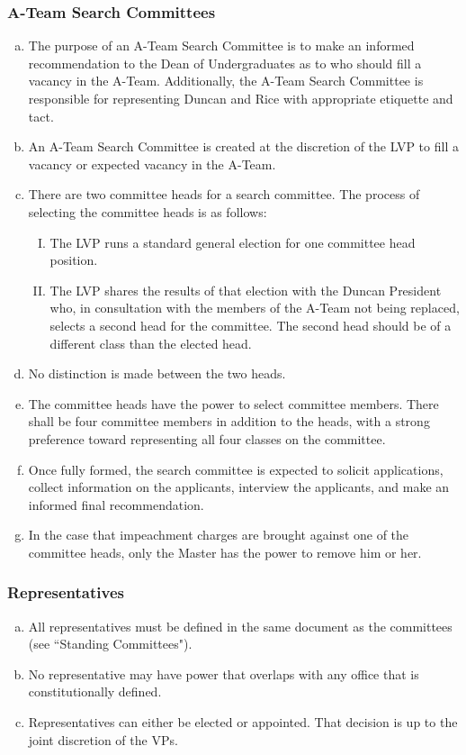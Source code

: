 \documentclass[USletter,12pt]{article}
\begin{document}
\begin{enumerate}[(a)]
\subsubsection{A-Team Search Committees}
	\begin{enumerate}[(a)]
	\item The purpose of an A-Team Search Committee is to make an informed recommendation to the Dean of Undergraduates as to who should fill a vacancy in the A-Team.  Additionally, the A-Team Search Committee is responsible for representing Duncan and Rice with appropriate etiquette and tact.
	\item An A-Team Search Committee is created at the discretion of the LVP to fill a vacancy or expected vacancy in the A-Team.
	\item There are two committee heads for a search committee.  The process of selecting the committee heads is as follows:
		\begin{enumerate}[(I)]
		\item The LVP runs a standard general election for one committee head position.
		\item The LVP shares the results of that election with the Duncan President who, in consultation with the members of the A-Team not being replaced, selects a second head for the committee.  The second head should be of a different class than the elected head.
		\end{enumerate}
	\item No distinction is made between the two heads.
	\item The committee heads have the power to select committee members.  There shall be four committee members in addition to the heads, with a strong preference toward representing all four classes on the committee. 
	\item Once fully formed, the search committee is expected to solicit applications, collect information on the applicants, interview the applicants, and make an informed final recommendation.
	\item In the case that impeachment charges are brought against one of the committee heads, only the Master has the power to remove him or her.
	\end{enumerate}

\subsubsection{Representatives}
	\begin{enumerate}[(a)]
	\item All representatives must be defined in the same document as the committees (see ``Standing Committees").
	\item No representative may have power that overlaps with any office that is constitutionally defined.
	\item Representatives can either be elected or appointed.  That decision is up to the joint discretion of the VPs.
	\end{enumerate}



\end{enumerate}
\end{document}
